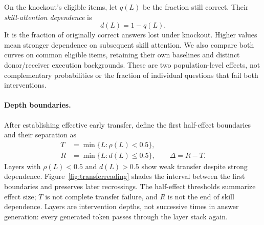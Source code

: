 On the knockout's eligible items, let $q(L)$ be the fraction still correct.
Their \emph{skill-attention dependence} is
\begin{equation}
d(L)=1-q(L).
\label{eq:dependence}
\end{equation}
It is the fraction of originally correct answers lost under knockout.
Higher values mean stronger dependence on subsequent skill attention.
We also compare both curves on common eligible items, retaining their
own baselines and distinct donor/receiver execution backgrounds.
These are two population-level effects, not complementary probabilities
or the fraction of individual questions that fail both interventions.

\paragraph{Depth boundaries.}
After establishing effective early transfer, define the first half-effect
boundaries and their separation as
\begin{equation}
\begin{aligned}
T&=\min\{L:\rho(L)<0.5\},\\
R&=\min\{L:d(L)\le0.5\},\qquad \Delta=R-T.
\end{aligned}
\label{eq:boundaries}
\end{equation}
Layers with $\rho(L)<0.5$ and $d(L)>0.5$ show weak transfer despite
strong dependence. Figure~\ref{fig:transferreading} shades the interval
between the first boundaries and preserves later recrossings.
The half-effect thresholds summarize effect size; $T$ is not complete
transfer failure, and $R$ is not the end of skill dependence. Layers are
intervention depths, not successive times in answer generation: every
generated token passes through the layer stack again.
